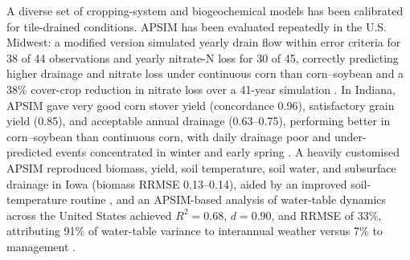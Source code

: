 A diverse set of cropping-system and biogeochemical models has been calibrated for tile-drained conditions. APSIM has been evaluated repeatedly in the U.S. Midwest: a modified version simulated yearly drain flow within error criteria for 38 of 44 observations and yearly nitrate-N loss for 30 of 45, correctly predicting higher drainage and nitrate loss under continuous corn than corn--soybean and a 38\% cover-crop reduction in nitrate loss over a 41-year simulation \parencite{Malone2007c}. In Indiana, APSIM gave very good corn stover yield (concordance 0.96), satisfactory grain yield (0.85), and acceptable annual drainage (0.63--0.75), performing better in corn--soybean than continuous corn, with daily drainage poor and under-predicted events concentrated in winter and early spring \parencite{Ojeda2018}. A heavily customised APSIM reproduced biomass, yield, soil temperature, soil water, and subsurface drainage in Iowa (biomass RRMSE 0.13--0.14), aided by an improved soil-temperature routine \parencite{Dietzel2016}, and an APSIM-based analysis of water-table dynamics across the United States achieved $R^2 = 0.68$, $d = 0.90$, and RRMSE of 33\%, attributing 91\% of water-table variance to interannual weather versus 7\% to management \parencite{Elli2023}.

